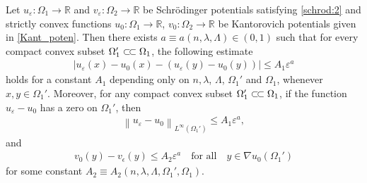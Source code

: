 \documentclass[reqno,12pt]{article}
\newcommand{\R}{\mathbb{R}}
\newcommand{\norm}[1]{\left\lVert#1\right\rVert}
\newcommand{\ssubset}{\subset\joinrel\subset}
\begin{document}
\begin{lemma}
    \label{lem:0E}
    Let $u_{\varepsilon} : \Omega_1\rightarrow \R$ and $v_{\varepsilon} : \Omega_2\rightarrow \R$ be Schr\"odinger potentials satisfying \eqref{schrod:2} and strictly convex functions $u_0 : \Omega_{1}\rightarrow \R$, $v_{0} : \Omega_{2}\rightarrow \R$ be Kantorovich potentials given in \eqref{Kant_poten}. Then there exists $a\equiv a(n,\lambda,\Lambda)\in (0,1)$ such that for every compact convex subset $\Omega_{1}'\ssubset \Omega_{1}$, the following estimate 
    \begin{align}
        \label{lem:0E:1}
        | u_{\varepsilon}(x)-u_0(x)-(u_{\varepsilon}(y)-u_{0}(y))|
        \leqslant A_{1}\varepsilon^{a}
    \end{align}
    holds for a constant $A_{1}$ depending only on $n,\lambda$, $\Lambda$, $\Omega_{1}'$ and $\Omega_{1}$, whenever $x,y\in \Omega_{1}'$. Moreover, for any compact convex subset $\Omega_{1}'\ssubset \Omega_{1}$, if the function $u_{\varepsilon}-u_{0}$ has a zero on $\Omega_{1}'$, then
    \begin{align}
        \label{lem:ABF:0}
        \norm{u_{\varepsilon}-u_0}_{L^{\infty}(\Omega_1')} \leqslant A_{1}\varepsilon^{a},
    \end{align}
    and
    \begin{align}
        \label{lem:ABF:3}
        v_{0}(y)-v_{\epsilon}(y) \leqslant A_{2}\varepsilon^{a}\quad\text{for all}\quad y\in\nabla u_{0}(\Omega_{1}')
    \end{align}
    for some constant $A_{2}\equiv A_{2}(n,\lambda,\Lambda,\Omega_{1}',\Omega_{1})$.
\end{lemma}
\end{document}
